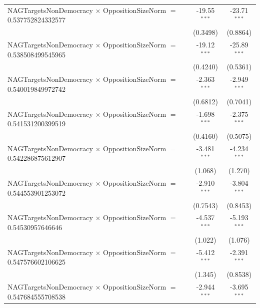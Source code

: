 \begin{tabular}{lcc}
   NAGTargetsNonDemocracy $\times$ OppositionSizeNorm $=$ 0.537752824332577     & -19.55$^{***}$       & -23.71$^{***}$\\   
                                                                                & (0.3498)             & (0.8864)\\   
   NAGTargetsNonDemocracy $\times$ OppositionSizeNorm $=$ 0.538508499545965     & -19.12$^{***}$       & -25.89$^{***}$\\   
                                                                                & (0.4240)             & (0.5361)\\   
   NAGTargetsNonDemocracy $\times$ OppositionSizeNorm $=$ 0.540019849972742     & -2.363$^{***}$       & -2.949$^{***}$\\   
                                                                                & (0.6812)             & (0.7041)\\   
   NAGTargetsNonDemocracy $\times$ OppositionSizeNorm $=$ 0.541531200399519     & -1.698$^{***}$       & -2.375$^{***}$\\   
                                                                                & (0.4160)             & (0.5075)\\   
   NAGTargetsNonDemocracy $\times$ OppositionSizeNorm $=$ 0.542286875612907     & -3.481$^{***}$       & -4.234$^{***}$\\   
                                                                                & (1.068)              & (1.270)\\   
   NAGTargetsNonDemocracy $\times$ OppositionSizeNorm $=$ 0.544553901253072     & -2.910$^{***}$       & -3.804$^{***}$\\   
                                                                                & (0.7543)             & (0.8453)\\   
   NAGTargetsNonDemocracy $\times$ OppositionSizeNorm $=$ 0.54530957646646      & -4.537$^{***}$       & -5.193$^{***}$\\   
                                                                                & (1.022)              & (1.076)\\   
   NAGTargetsNonDemocracy $\times$ OppositionSizeNorm $=$ 0.547576602106625     & -5.412$^{***}$       & -2.391$^{***}$\\   
                                                                                & (1.345)              & (0.8538)\\   
   NAGTargetsNonDemocracy $\times$ OppositionSizeNorm $=$ 0.547684555708538     & -2.944$^{***}$       & -3.695$^{***}$\\   

\end{tabular}
